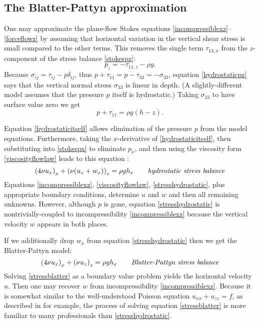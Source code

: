\documentclass[letterpaper,final,12pt,reqno]{amsart}
\begin{document}
\subsection*{The Blatter-Pattyn approximation}  One may approximate the plane-flow Stokes equations \eqref{incompressiblexz}--\eqref{forceflowz} by assuming that horizontal variation in the vertical shear stress is small compared to the other terms.  This removes the single term  $\tau_{13,x}$ from the $z$-component of the stress balance \eqref{stokespz}:
\begin{equation}
p_z = - \tau_{11,z} - \rho g. \label{hydrostaticpz}
\end{equation}
Because $\sigma_{ij} = \tau_{ij} - p \delta_{ij}$, thus $p + \tau_{11} = p - \tau_{33} = - \sigma_{33}$, equation \eqref{hydrostaticpz} says that the vertical normal stress $\sigma_{33}$ is linear in depth.  (A slightly-different model assumes that the pressure $p$ itself is hydrostatic.)  Taking $\sigma_{33}$ to have surface value zero we get
\begin{equation}
p + \tau_{11} = \rho g (h-z). \label{hydrostaticitself}
\end{equation}

Equation \eqref{hydrostaticitself} allows elimination of the pressure $p$ from the model equations.  Furthermore, taking the $x$-derivative of \eqref{hydrostaticitself}, then substituting into \eqref{stokespx} to eliminate $p_x$, and then using the viscosity form \eqref{viscosityflowlaw} leads to this equation \cite{GreveBlatter2009}:
\begin{equation}
\left(4 \nu u_x\right)_x + \left(\nu (u_z+w_x)\right)_z = \rho g h_x \qquad\text{\emph{hydrostatic stress balance}} \label{stresshydrostatic}
\end{equation}
Equations \eqref{incompressiblexz}, \eqref{viscosityflowlaw}, \eqref{stresshydrostatic}, plus appropriate boundary conditions, determine $u$ and $w$ and then all remaining unknowns.  However, although $p$ is gone, equation \eqref{stresshydrostatic} is nontrivially-coupled to incompressibility \eqref{incompressiblexz} because the vertical velocity $w$ appears in both places.

If we additionally drop $w_x$ from equation \eqref{stresshydrostatic} then we get the Blatter-Pattyn model:
\begin{equation}
\left(4 \nu u_x\right)_x + \left(\nu u_z\right)_z = \rho g h_x \qquad\text{\emph{Blatter-Pattyn stress balance}} \label{stressblatter}
\end{equation}
Solving \eqref{stressblatter} as a boundary value problem yields the horizontal velocity $u$.  Then one may recover $w$ from incompressibility \eqref{incompressiblexz}.  Because it is somewhat similar to the well-understood Poisson equation $u_{xx} + u_{zz} = f$, as described in \cite{LeVequeFD,MortonMayers} for example, the process of solving equation \eqref{stressblatter} is more familiar to many professionals than \eqref{stresshydrostatic}.
\end{document}
